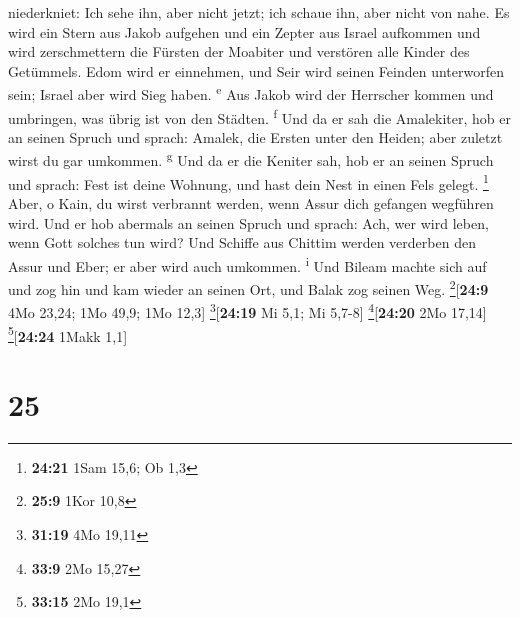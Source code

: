 niederkniet:  Ich sehe ihn, aber nicht jetzt; ich schaue
ihn, aber nicht von nahe. Es wird ein Stern aus Jakob aufgehen und ein
Zepter aus Israel aufkommen und wird zerschmettern die Fürsten der
Moabiter und verstören alle Kinder des Getümmels.  Edom
wird er einnehmen, und Seir wird seinen Feinden unterworfen sein; Israel
aber wird Sieg haben. \textsuperscript{e}  Aus Jakob wird
der Herrscher kommen und umbringen, was übrig ist von den Städten.
\textsuperscript{f}  Und da er sah die Amalekiter, hob er
an seinen Spruch und sprach: Amalek, die Ersten unter den Heiden; aber
zuletzt wirst du gar umkommen. \textsuperscript{g}  Und
da er die Keniter sah, hob er an seinen Spruch und sprach: Fest ist
deine Wohnung, und hast dein Nest in einen Fels gelegt. \footnote{\textbf{24:21}
  1Sam 15,6; Ob 1,3}  Aber, o Kain, du wirst verbrannt
werden, wenn Assur dich gefangen wegführen wird.  Und er
hob abermals an seinen Spruch und sprach: Ach, wer wird leben, wenn Gott
solches tun wird?  Und Schiffe aus Chittim werden
verderben den Assur und Eber; er aber wird auch umkommen.
\textsuperscript{i}  Und Bileam machte sich auf und zog
hin und kam wieder an seinen Ort, und Balak zog seinen Weg.
\footnote{\textbf{25:9} 1Kor 10,8}{[}\textbf{24:9} 4Mo 23,24; 1Mo 49,9;
1Mo 12,3{]} \footnote{\textbf{31:19} 4Mo 19,11}{[}\textbf{24:19} Mi 5,1;
Mi 5,7-8{]} \footnote{\textbf{33:9} 2Mo 15,27}{[}\textbf{24:20} 2Mo
17,14{]} \footnote{\textbf{33:15} 2Mo 19,1}{[}\textbf{24:24} 1Makk
1,1{]}

\hypertarget{section-24}{%
\section{25}\label{section-24}}

